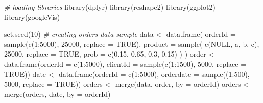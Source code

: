 \documentclass[
]{book}
\newenvironment{Shaded}{\begin{snugshade}}{\end{snugshade}}
\newcommand{\AttributeTok}[1]{\textcolor[rgb]{0.77,0.63,0.00}{#1}}
\newcommand{\CommentTok}[1]{\textcolor[rgb]{0.56,0.35,0.01}{\textit{#1}}}
\newcommand{\ConstantTok}[1]{\textcolor[rgb]{0.00,0.00,0.00}{#1}}
\newcommand{\DecValTok}[1]{\textcolor[rgb]{0.00,0.00,0.81}{#1}}
\newcommand{\FloatTok}[1]{\textcolor[rgb]{0.00,0.00,0.81}{#1}}
\newcommand{\FunctionTok}[1]{\textcolor[rgb]{0.00,0.00,0.00}{#1}}
\newcommand{\NormalTok}[1]{#1}
\newcommand{\OtherTok}[1]{\textcolor[rgb]{0.56,0.35,0.01}{#1}}
\newcommand{\SpecialCharTok}[1]{\textcolor[rgb]{0.00,0.00,0.00}{#1}}
\newcommand{\StringTok}[1]{\textcolor[rgb]{0.31,0.60,0.02}{#1}}
\begin{document}
\begin{Shaded}
\begin{Highlighting}[]
\CommentTok{\# loading libraries}
\FunctionTok{library}\NormalTok{(dplyr)}
\FunctionTok{library}\NormalTok{(reshape2)}
\FunctionTok{library}\NormalTok{(ggplot2)}
\FunctionTok{library}\NormalTok{(googleVis)}

\FunctionTok{set.seed}\NormalTok{(}\DecValTok{10}\NormalTok{)}
\CommentTok{\# creating orders data sample}
\NormalTok{data }\OtherTok{\textless{}{-}} \FunctionTok{data.frame}\NormalTok{(}
    \AttributeTok{orderId =} \FunctionTok{sample}\NormalTok{(}\FunctionTok{c}\NormalTok{(}\DecValTok{1}\SpecialCharTok{:}\DecValTok{5000}\NormalTok{), }\DecValTok{25000}\NormalTok{, }\AttributeTok{replace =} \ConstantTok{TRUE}\NormalTok{),}
    \AttributeTok{product =} \FunctionTok{sample}\NormalTok{(}
        \FunctionTok{c}\NormalTok{(}\StringTok{\textquotesingle{}NULL\textquotesingle{}}\NormalTok{, }\StringTok{\textquotesingle{}a\textquotesingle{}}\NormalTok{, }\StringTok{\textquotesingle{}b\textquotesingle{}}\NormalTok{, }\StringTok{\textquotesingle{}c\textquotesingle{}}\NormalTok{),}
        \DecValTok{25000}\NormalTok{,}
        \AttributeTok{replace =} \ConstantTok{TRUE}\NormalTok{,}
        \AttributeTok{prob =} \FunctionTok{c}\NormalTok{(}\FloatTok{0.15}\NormalTok{, }\FloatTok{0.65}\NormalTok{, }\FloatTok{0.3}\NormalTok{, }\FloatTok{0.15}\NormalTok{)}
\NormalTok{    )}
\NormalTok{)}
\NormalTok{order }\OtherTok{\textless{}{-}} \FunctionTok{data.frame}\NormalTok{(}\AttributeTok{orderId =} \FunctionTok{c}\NormalTok{(}\DecValTok{1}\SpecialCharTok{:}\DecValTok{5000}\NormalTok{),}
                    \AttributeTok{clientId =} \FunctionTok{sample}\NormalTok{(}\FunctionTok{c}\NormalTok{(}\DecValTok{1}\SpecialCharTok{:}\DecValTok{1500}\NormalTok{), }\DecValTok{5000}\NormalTok{, }\AttributeTok{replace =} \ConstantTok{TRUE}\NormalTok{))}
\NormalTok{date }\OtherTok{\textless{}{-}} \FunctionTok{data.frame}\NormalTok{(}\AttributeTok{orderId =} \FunctionTok{c}\NormalTok{(}\DecValTok{1}\SpecialCharTok{:}\DecValTok{5000}\NormalTok{),}
                   \AttributeTok{orderdate =} \FunctionTok{sample}\NormalTok{((}\DecValTok{1}\SpecialCharTok{:}\DecValTok{500}\NormalTok{), }\DecValTok{5000}\NormalTok{, }\AttributeTok{replace =} \ConstantTok{TRUE}\NormalTok{))}
\NormalTok{orders }\OtherTok{\textless{}{-}} \FunctionTok{merge}\NormalTok{(data, order, }\AttributeTok{by =} \StringTok{\textquotesingle{}orderId\textquotesingle{}}\NormalTok{)}
\NormalTok{orders }\OtherTok{\textless{}{-}} \FunctionTok{merge}\NormalTok{(orders, date, }\AttributeTok{by =} \StringTok{\textquotesingle{}orderId\textquotesingle{}}\NormalTok{)}

\end{Highlighting}
\end{Shaded}
\end{document}
